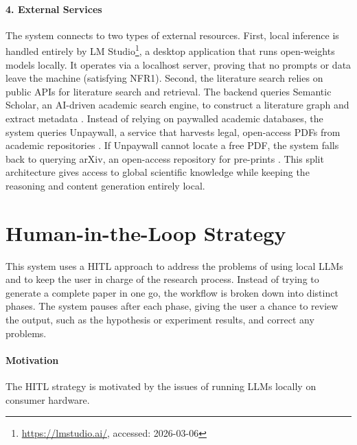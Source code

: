 \paragraph{4. External Services}
The system connects to two types of external resources.
First, local inference is handled entirely by LM Studio\footnote{\url{https://lmstudio.ai/}, accessed: 2026-03-06}, a desktop application that runs open-weights models locally.
It operates via a localhost server, proving that no prompts or data leave the machine (satisfying NFR1).
Second, the literature search relies on public APIs for literature search and retrieval.
The backend queries Semantic Scholar, an AI-driven academic search engine, to construct a literature graph and extract metadata \cite{kinney2025semanticscholaropendata}.
Instead of relying on paywalled academic databases, the system queries Unpaywall, a service that harvests legal, open-access PDFs from academic repositories \cite{Unpaywall}.
If Unpaywall cannot locate a free PDF, the system falls back to querying arXiv, an open-access repository for pre-prints \cite{arXiv}.
This split architecture gives access to global scientific knowledge while keeping the reasoning and content generation entirely local.



\section{Human-in-the-Loop Strategy}
This system uses a HITL approach to address the problems of using local LLMs and to keep the user in charge of the research process. 
Instead of trying to generate a complete paper in one go, the workflow is broken down into distinct phases. 
The system pauses after each phase, giving the user a chance to review the output, such as the hypothesis or experiment results, 
and correct any problems.


\paragraph{Motivation}
The HITL strategy is motivated by the issues of running LLMs locally on consumer hardware.

